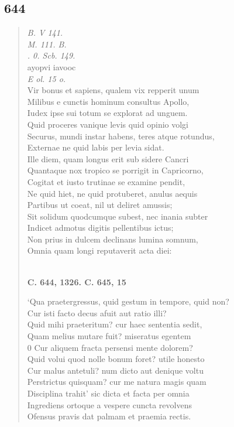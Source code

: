 \documentclass[11pt, a4paper]{report}
\begin{document}
            \subsection*{644}
      \begin{verse}
      \textit{B. V 141.} \\ \textit{M. 111. B.} \\ \textit{. 0. Scb. 149.} \\ ayopvi iavooc \\ \textit{E ol. 15 o.} \\ Vir bonus et sapiens, qualem vix repperit unum \\ Milibus e cunctis hominum consultus Apollo, \\ Iudex ipse sui totum se explorat ad unguem. \\ Quid proceres vanique levis quid opinio volgi \\ Securus, mundi instar habens, teres atque rotundus, \\ Externae ne quid labis per levia sidat. \\ Ille diem, quam longus erit sub sidere Cancri \\ Quantaque nox tropico se porrigit in Capricorno, \\ Cogitat et iusto trutinae se examine pendit, \\ Ne quid hiet, ne quid protuberet, anulus aequis \\ Partibus ut coeat, nil ut deliret amussis; \\ Sit solidum quodcumque subest, nec inania subter \\ Indicet admotus digitis pellentibus ictus; \\ Non prius in dulcem declinans lumina somnum, \\ Omnia quam longi reputaverit acta diei: \\ 
        ﻿\pagebreak 
    \begin{center} \textbf{C. 644, 1326. C. 645, 15} \end{center} \marginpar{[111]} ‘Qua praetergressus, quid gestum in tempore, quid non? \\ Cur isti facto decus afuit aut ratio illi? \\ Quid mihi praeteritum? cur haec sententia sedit, \\ Quam melius mutare fuit? miseratus egentem \\ 0 Cur aliquem fracta persensi mente dolorem? \\ Quid volui quod nolle bonum foret? utile honesto \\ Cur malus antetuli? num dicto aut denique voltu \\ Perstrictus quisquam? cur me natura magis quam \\ Disciplina trahit’ sic dicta et facta per omnia \\ Ingrediens ortoque a vespere cuncta revolvens \\ Ofensus pravis dat palmam et praemia rectis. \\ 
      \end{verse}
  
\end{document}
